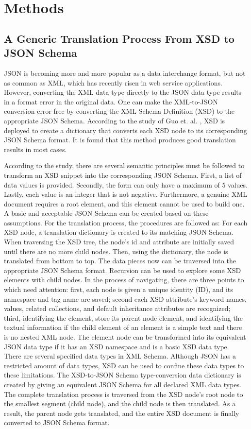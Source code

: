\section{Methods}
\subsection{A Generic Translation Process From XSD to JSON Schema}
JSON is becoming more and more popular as a data interchange format, but not as
common as XML, which has recently risen in web service applications. However,
converting the XML data type directly to the JSON data type results in a format
error in the original data. One can make the XML-to-JSON conversion error-free
by converting the XML Schema Definition (XSD) to the appropriate JSON Schema.
According to the study of Guo et. al. \autocite{Guo2017}, XSD is deployed to
create a dictionary that converts each XSD node to its corresponding JSON Schema
format. It is found that this method produces good translation results in most
cases.

According to the study, there are several semantic principles must be followed
to transform an XSD snippet into the corresponding JSON Schema. First, a list of
data values is provided. Secondly, the form can only have a maximum of 5 values.
Lastly, each value is an integer that is not negative. Furthermore, a genuine
XML document requires a root element, and this element cannot be used to build
one. A basic and acceptable JSON Schema can be created based on these
assumptions. For the translation process, the procedures are followed as: For
each XSD node, a translation dictionary is created to its matching JSON Schema.
When traversing the XSD tree, the node's id and attribute are initially saved
until there are no more child nodes. Then, using the dictionary, the node is
translated from bottom to top. The data pieces now can be traversed into the
appropriate JSON Schema format. Recursion can be used to explore some XSD
elements with child nodes. In the process of navigating, there are three points
to which need attention: first, each node is given a unique identity (ID), and
its namespace and tag name are saved; second each XSD attribute's keyword names,
values, related collections, and default inheritance attributes are recognized;
third, identifying the element, store its parent node element, and identifying
the textual information if the child element of an element is a simple text and
there is no nested XML node. The element node can be transformed into its
equivalent JSON data type if it has an XSD namespace and is a basic XSD data
type. There are several specified data types in XML Schema. Although JSON has a
restricted amount of data types, XSD can be used to confine these data types to
these limitations. The XSD-to-JSON Schema type-conversion data dictionary is
created by giving an equivalent JSON Schema for all declared XML data types. The
complete translation process is traversed from the XSD node's root node to the
smallest segment (child node), and the child node is then translated. As a
result, the parent node gets translated, and the entire XSD document is finally
converted to JSON Schema format.

